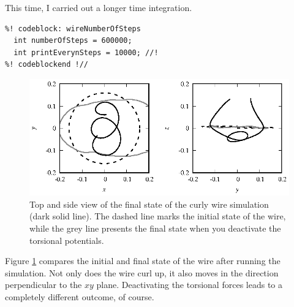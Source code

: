 This time, I carried out a longer time integration.
\begin{lstlisting}
%! codeblock: wireNumberOfSteps
  int numberOfSteps = 600000;
  int printEverynSteps = 10000; //!
%! codeblockend !//
\end{lstlisting}

\begin{figure}
  \centering
  \includegraphics[width = \textwidth]{figures/curlyWire.eps}
  \caption{\label{curlyWire}Top and side view of the final state of the curly
           wire simulation (dark solid line). The dashed line marks the initial
           state of the wire, while the grey line presents the final state when
           you deactivate the torsional potentials.}
\end{figure}

Figure \ref{curlyWire} compares the initial and final state of the wire after
running the simulation. Not only does the wire curl up, it also moves in the
direction perpendicular to the $xy$ plane. Deactivating the torsional forces
leads to a completely different outcome, of course.

